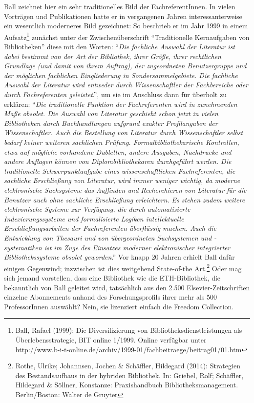 \documentclass[a4paper,
fontsize=11pt,
oneside,
numbers=noperiodatend,
parskip=half-,
bibliography=totoc,
final
]{scrartcl}
\begin{document}
Ball zeichnet hier ein sehr traditionelles Bild der FachreferentInnen.
In vielen Vorträgen und Publikationen hatte er in vergangenen Jahren
interessanterweise ein wesentlich moderneres Bild gezeichnet: So
beschrieb er im Jahr 1999 in einem Aufsatz\footnote{Ball, Rafael (1999):
  Die Diversifizierung von Bibliotheksdienstleistungen als
  Überlebensstrategie, BIT online 1/1999. Online verfügbar unter
  \url{http://www.b-i-t-online.de/archiv/1999-01/fachbeitraege/beitrag01/01.htm}}
zunächst unter der Zwischenüberschrift \enquote{Traditionelle
Kernaufgaben von Bibliotheken} diese mit den Worten: \enquote{\emph{Die
fachliche Auswahl der Literatur ist dabei bestimmt von der Art der
Bibliothek, ihrer Größe, ihrer rechtlichen Grundlage (und damit von
ihrem Auftrag), der zugeordneten Benutzergruppe und der möglichen
fachlichen Eingliederung in Sondersammelgebiete. Die fachliche Auswahl
der Literatur wird entweder durch Wissenschaftler der Fachbereiche oder
durch Fachreferenten geleistet}.}, um sie im Anschluss dann für überholt
zu erklären: \enquote{\emph{Die traditionelle Funktion der
Fachreferenten wird in zunehmenden Maße obsolet. Die Auswahl von
Literatur geschieht schon jetzt in vielen Bibliotheken durch
Buchhandlungen aufgrund exakter Profilangaben der Wissenschaftler. Auch
die Bestellung von Literatur durch Wissenschaftler selbst bedarf keiner
weiteren sachlichen Prüfung. Formalbibliothekarische Kontrollen, etwa
auf mögliche vorhandene Dubletten, andere Ausgaben, Nachdrucke und
andere Auflagen können von Diplombibliothekaren durchgeführt werden. Die
traditionelle Schwerpunktaufgabe eines wissenschaftlichen
Fachreferenten, die sachliche Erschließung von Literatur, wird immer
weniger wichtig, da moderne elektronische Suchsysteme das Auffinden und
Recherchieren von Literatur für die Benutzer auch ohne sachliche
Erschließung erleichtern. Es stehen zudem weitere elektronische Systeme
zur Verfügung, die durch automatisierte Indexierungssysteme und
formalisierte Logiken intellektuelle Erschließungsarbeiten der
Fachreferenten überflüssig machen. Auch die Entwicklung von Thesauri und
von übergeordneten Suchsystemen und -systematiken ist im Zuge des
Einsatzes moderner elektronischer integrierter Bibliothekssysteme
obsolet geworden}.} Vor knapp 20 Jahren erhielt Ball dafür einigen
Gegenwind; inzwischen ist dies weitgehend State-of-the Art.\footnote{Rothe,
  Ulrike; Johannsen, Jochen \& Schäffler, Hildegard (2014): Strategien
  des Bestandsaufbaus in der hybriden Bibliothek. In: Griebel, Rolf;
  Schäffler, Hildegard \& Söllner, Konstanze: Praxishandbuch
  Bibliotheksmanagement. Berlin/Boston: Walter de Gruyter} Oder mag sich
jemand vorstellen, dass eine Bibliothek wie die ETH-Bibliothek, die
bekanntlich von Ball geleitet wird, tatsächlich aus den 2.500
Elsevier-Zeitschriften einzelne Abonnements anhand des Forschungsprofils
ihrer mehr als 500 ProfessorInnen auswählt? Nein, sie lizenziert einfach
die Freedom Collection.
\end{document}

